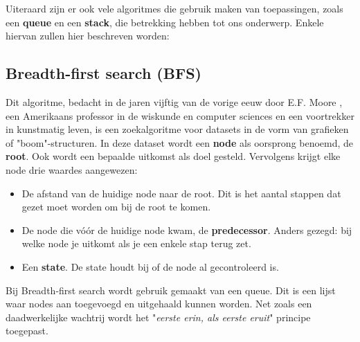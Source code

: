 Uiteraard zijn er ook vele algoritmes die gebruik maken van toepassingen, zoals een \textbf{queue} en een \textbf{stack}, die betrekking hebben tot ons onderwerp. Enkele hiervan zullen hier beschreven worden:

\subsection{Breadth-first search (BFS)}
Dit algoritme, bedacht in de jaren vijftig van de vorige eeuw door E.F. Moore \cite{Moore}, een Amerikaans professor in de wiskunde en computer sciences en een voortrekker in kunstmatig leven, is een zoekalgoritme voor datasets in de vorm van grafieken of "boom"-structuren. In deze dataset wordt een \textbf{node} als oorsprong benoemd, de \textbf{root}. Ook wordt een bepaalde uitkomst als doel gesteld. Vervolgens krijgt elke node drie waardes aangewezen:
\begin{itemize}
\item De afstand van de huidige node naar de root. Dit is het aantal stappen dat gezet moet worden om bij de root te komen. 
\item De node die v\'{o}\'{o}r de huidige node kwam, de \textbf{predecessor}. Anders gezegd: bij welke node je uitkomt als je een enkele stap terug zet.
\item Een \textbf{state}. De state houdt bij of de node al gecontroleerd is.
\end{itemize}

Bij Breadth-first search wordt gebruik gemaakt van een queue. Dit is een lijst waar nodes aan toegevoegd en uitgehaald kunnen worden. Net zoals een daadwerkelijke wachtrij wordt het "\textit{eerste erin, als eerste eruit}" principe toegepast.


